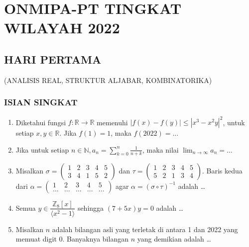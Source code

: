 \documentclass[12pt,twoside]{article}
\begin{document}
\section{ONMIPA-PT TINGKAT WILAYAH 2022}
\subsection{HARI PERTAMA}
\begin{center}
	(ANALISIS REAL, STRUKTUR ALJABAR, KOMBINATORIKA)
\end{center}
\subsubsection*{ISIAN SINGKAT}
\begin{enumerate}
	\item Diketahui fungsi $f:\mathbb{R}\to\mathbb{R}$ memenuhi $|f(x)-f(y)|\leq |x^3-x^2y|^2$, untuk setiap $x,y\in\mathbb{R}$. Jika $f(1)=1$, maka $f(2022)=\dots$
	\item Jika untuk setiap $n\in\mathbb{N}, a_n=\displaystyle\sum_{k=0}^n \frac{1}{n+k}$, maka nilai $\displaystyle\lim_{n\to\infty} a_n=\dots$
	\item Misalkan $\sigma =\begin{pmatrix}
			      1 & 2 & 3 & 4 & 5 \\ 3 & 4 & 1 & 5 & 2
		      \end{pmatrix}$ dan $\tau=\begin{pmatrix}
			      1 & 2 & 3 & 4 & 5 \\
			      5 & 2 & 1 & 3 & 4
		      \end{pmatrix}$. Baris kedua dari $\alpha =\begin{pmatrix}
			      1     & 2     & 3     & 4     & 5     \\
			      \dots & \dots & \dots & \dots & \dots
		      \end{pmatrix}$ agar $\alpha=(\sigma\circ\tau)^{-1}$ adalah \dots
	\item Semua $y\in\dfrac{\mathbb{Z}_8[x]}{\langle x^2-1\rangle}$ sehingga $(7+5x)y=0$ adalah \dots
	\item Misalkan $n$ adalah bilangan asli yang terletak di antara 1 dan 2022 yang memuat digit 0. Banyaknya bilangan $n$ yang demikian adalah \dots
\end{enumerate}
\end{document}
